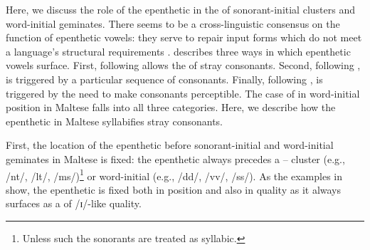 \documentclass[output=paper]{langsci/langscibook}
\begin{document}
Here, we discuss the role of the epenthetic  in the  of sonorant-initial clusters and word-initial geminates. There seems to be a cross-linguistic consensus on the function of epenthetic vowels: they serve to repair input forms which do not meet a language’s structural requirements \citep{hall2011}. \citet{hall2011} describes three ways in which epenthetic vowels surface. First, following \citet{ito1986,ito1989}  allows the  of stray consonants. Second, following \citet{broselow1982},  is triggered by a particular sequence of consonants. Finally, following \citet{cote2000},  is triggered by the need to make consonants perceptible. The case of  in word-initial position in Maltese falls into all three categories. Here, we describe how the epenthetic  in Maltese syllabifies stray consonants. 

First, the location of the epenthetic  before sonorant-initial and word-initial geminates in Maltese is fixed: the epenthetic  always precedes a – cluster (e.g., /nt/, /lt/, /ms/)\footnote{Unless such the sonorants are treated as syllabic.}  or word-initial  (e.g., /dd/, /vv/, /ss/). As the examples in  show, the epenthetic  is fixed both in position and also in quality as it always surfaces as a  of /ɪ/-like quality. 

\begin{table}
\caption{Epenthetic vowel before sonorant-initial consonant clusters and word-initial geminates}
\label{tab:galea:5}
\end{table}
\end{document}
